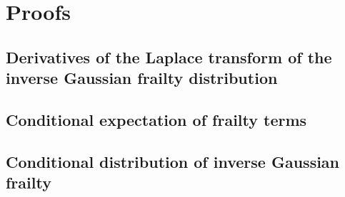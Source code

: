 \documentclass[nojss]{jss}
\begin{document}
% 


\clearpage
\appendix
\section{Proofs}
\subsection{Derivatives of the Laplace transform of the inverse Gaussian frailty distribution} 
  \label{app:derLTIG}
  
  
\clearpage
\subsection{Conditional expectation of frailty terms}
  \label{app:condEfrailty}
  

\clearpage
\subsection{Conditional distribution of inverse Gaussian frailty} 
  \label{app:condIG}
  
\end{document}
